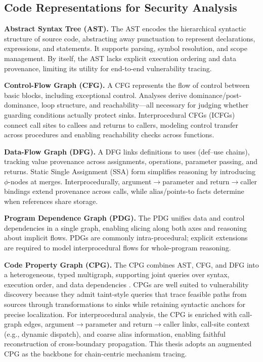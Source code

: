 \documentclass{buthesis}
\begin{document}
\subsection{Code Representations for Security Analysis}
\label{sec:intro-repr}

\textbf{Abstract Syntax Tree (AST).}
The AST encodes the hierarchical syntactic structure of source code, abstracting away punctuation to represent declarations, expressions, and statements. It supports parsing, symbol resolution, and scope management. By itself, the AST lacks explicit execution ordering and data provenance, limiting its utility for end-to-end vulnerability tracing.

\textbf{Control-Flow Graph (CFG).}
A CFG represents the flow of control between basic blocks, including exceptional control. Analyses derive dominance/post-dominance, loop structure, and reachability---all necessary for judging whether guarding conditions actually protect sinks. Interprocedural CFGs (ICFGs) connect call sites to callees and returns to callers, modeling control transfer across procedures and enabling reachability checks across functions.

\textbf{Data-Flow Graph (DFG).}
A DFG links definitions to uses (def--use chains), tracking value provenance across assignments, operations, parameter passing, and returns. Static Single Assignment (SSA) form simplifies reasoning by introducing $\phi$-nodes at merges. Interprocedurally, argument$\rightarrow$parameter and return$\rightarrow$caller bindings extend provenance across calls, while alias/points-to facts determine when references share storage.

\textbf{Program Dependence Graph (PDG).}
The PDG unifies data and control dependencies in a single graph, enabling slicing along both axes and reasoning about implicit flows. PDGs are commonly intra-procedural; explicit extensions are required to model interprocedural flows for whole-program reasoning.

\textbf{Code Property Graph (CPG).}
The CPG combines AST, CFG, and DFG into a heterogeneous, typed multigraph, supporting joint queries over syntax, execution order, and data dependencies \cite{yamaguchi2014cpg}. CPGs are well suited to vulnerability discovery because they admit taint-style queries that trace feasible paths from sources through transformations to sinks while retaining syntactic anchors for precise localization. For interprocedural analysis, the CPG is enriched with call-graph edges, argument$\rightarrow$parameter and return$\rightarrow$caller links, call-site context (e.g., dynamic dispatch), and coarse alias information, enabling faithful reconstruction of cross-boundary propagation. This thesis adopts an augmented CPG as the backbone for chain-centric mechanism tracing.
\end{document}

